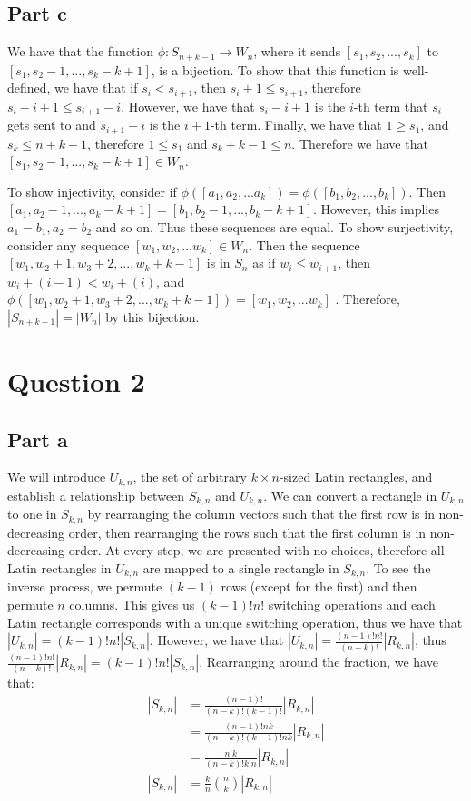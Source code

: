 \documentclass[]{article}
\begin{document}
\subsection{Part c}
We have that the function $\phi: S_{n + k - 1} \rightarrow W_n$, where it sends $[s_1, s_2, ..., s_{k}]$ to $[s_1, s_2 - 1, ..., s_{k} - k + 1]$, is a bijection. 
To show that this function is well-defined, we have that if $s_i < s_{i+1}$, then $s_i + 1 \leq s_{i + 1}$, therefore $s_i - i + 1 \leq s_{i + 1} - i$. However, we have that $s_i - i + 1$ is the $i$-th term that $s_i$ gets sent to and $s_{i + 1} - i$ is the $i + 1$-th term. Finally, we have that $1 \geq s_1$, and $s_k \leq n + k - 1$, therefore $ 1 \leq s_1 $ and $s_k + k - 1 \leq n$. Therefore we have that $[s_1, s_2 - 1, ..., s_{k} - k + 1] \in W_n$. 

To show injectivity, consider if $\phi([a_1, a_2, ... a_k]) = \phi([b_1, b_2, ..., b_k])$. Then $[a_1, a_2 -1, ..., a_k - k + 1] = [b_1, b_2 -1, ..., b_k - k + 1]$. However, this implies $a_1 = b_1, a_2 = b_2$ and so on. Thus these sequences are equal.
To show surjectivity, consider any sequence $[w_1, w_2, ... w_k]\in W_n$. Then the sequence $[w_1, w_2 + 1, w_3 + 2, ..., w_k + k - 1]$ is in $S_n$ as if $w_i \leq w_{i + 1}$, then $w_{i} + (i - 1) < w_i + (i)$, and $\phi([w_1, w_2 + 1, w_3 + 2, ..., w_k + k - 1]) = [w_1, w_2, ... w_k]$ . Therefore, $|S_{n + k - 1}| = |W_n|$ by this bijection. 
\newpage
\section{Question 2}
\subsection{Part a}
We will introduce $U_{k, n}$, the set of arbitrary $k \times n$-sized Latin rectangles, and establish a relationship between $S_{k,n}$ and $U_{k,n}$. We can convert a rectangle in $U_{k,n}$ to one in $S_{k,n}$ by rearranging the column vectors such that the first row is in non-decreasing order, then rearranging the rows such that the first column is in non-decreasing order. At every step, we are presented with no choices, therefore all Latin rectangles in $U_{k,n}$ are mapped to a single rectangle in $S_{k,n}$. To see the inverse process, we permute $(k - 1)$ rows (except for the first) and then permute $n$ columns. This gives us $(k - 1)! n!$ switching operations and each Latin rectangle corresponds with a unique switching operation, thus we have that $|U_{k, n}| = (k - 1)! n! |S_{k, n}|$. However, we have that $|U_{k, n}| = \frac{(n - 1)! n!}{(n-k)!} |R_{k,n}|$, thus $\frac{(n - 1)! n!}{(n-k)!} |R_{k,n}|= (k - 1)! n! |S_{k, n}|$. Rearranging around the fraction, we have that:
\begin{align*}
	|S_{k, n}| &= \frac{(n - 1)!}{(n-k)!(k - 1)!} |R_{k,n}|\\
	&= \frac{(n - 1)! n k}{(n-k)!(k - 1)! n k} |R_{k,n}|\\
	&= \frac{n! k}{(n-k)! k! n} |R_{k, n}|\\
	|S_{k, n}| &= \frac{k}{n} \binom{n}{k} |R_{k, n}|
\end{align*}
\end{document}
